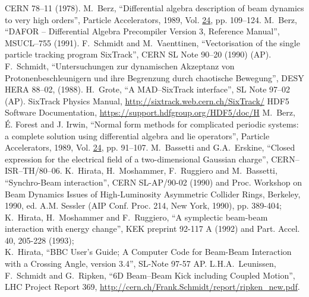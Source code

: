 \begin{thebibliography}{99}
        CERN 78--11 (1978).  
        M.~Berz,
        ``Differential algebra description of beam dynamics to very high orders'',
        Particle Accelerators, 1989, Vol. \underline{24}, pp. 109--124.
        M.~Berz,
        ``DAFOR -- Differential Algebra Precompiler Version 3, Reference Manual'',
        MSUCL--755 (1991).
        F.~Schmidt and M.~Vaenttinen,
        ``Vectorisation of the single particle tracking program SixTrack'',
        CERN SL Note 90--20 (1990) (AP).  
        F.~Schmidt,
        ``Untersuchungen zur dynamischen Akzeptanz von Protonenbeschleunigern und ihre Begrenzung durch chaotische Bewegung'',
        DESY HERA 88--02, (1988).  
        H.~Grote,
        ``A MAD--SixTrack interface'',
        SL Note 97--02 (AP).  
        SixTrack Physics Manual,
        \url{http://sixtrack.web.cern.ch/SixTrack/}
        HDF5 Software Documentation,
        \url{https://support.hdfgroup.org/HDF5/doc/H}
        M.~Berz, \'{E}. Forest and J. Irwin,
        ``Normal form methods for complicated periodic systems: a complete solution using differential algebra and lie operators'',
        Particle Accelerators, 1989, Vol. \underline{24}, pp. 91--107.  
        M.~Bassetti and G.A.~Erskine,
        ``Closed expression for the electrical field of a two-dimensional Gaussian charge'',
        CERN--ISR--TH/80--06.  
        K.~Hirata, H.~Moshammer, F.~Ruggiero and M.~Bassetti,
        ``Synchro-Beam interaction'',
        CERN SL-AP/90-02 (1990) and Proc. Workshop on Beam Dynamics Issues of High-Luminosity Asymmetric Collider Rings, Berkeley, 1990, ed. A.M. Sessler (AIP Conf. Proc. 214, New York, 1990), pp. 389-404;\\
        K.~Hirata, H.~Moshammer and F.~Ruggiero,
        ``A symplectic beam-beam interaction with energy change'',
        KEK preprint 92-117 A (1992) and Part. Accel. 40, 205-228 (1993);\\
        K.~Hirata,
        ``BBC User's Guide; A Computer Code for Beam-Beam Interaction with a Crossing Angle, version 3.4'',
        SL-Note 97-57 AP.
        L.H.A.~Leunissen, F.~Schmidt and G.~Ripken,
        ``6D Beam--Beam Kick including Coupled Motion'',
        LHC Project Report 369, \url{http://cern.ch/Frank.Schmidt/report/ripken\_new.pdf}.

\end{thebibliography}
